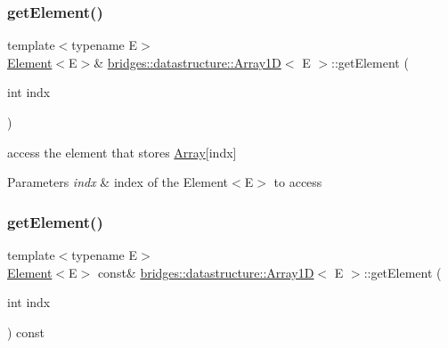 \subsubsection{\texorpdfstring{get\+Element()}{getElement()}\hspace{0.1cm}{\footnotesize\ttfamily [1/2]}}
{\footnotesize\ttfamily template$<$typename E$>$ \\
\hyperlink{classbridges_1_1datastructure_1_1_element}{Element}$<$E$>$\& \hyperlink{classbridges_1_1datastructure_1_1_array1_d}{bridges\+::datastructure\+::\+Array1D}$<$ E $>$\+::get\+Element (\begin{DoxyParamCaption}\item[{int}]{indx }\end{DoxyParamCaption})\hspace{0.3cm}{\ttfamily [inline]}}



access the element that stores \hyperlink{classbridges_1_1datastructure_1_1_array}{Array}\mbox{[}indx\mbox{]} 


\begin{DoxyParams}{Parameters}
{\em indx} & index of the Element$<$\+E$>$ to access \\
\hline
\end{DoxyParams}
\mbox{\label{classbridges_1_1datastructure_1_1_array1_d_a92398a260b9d2a09d6f1f536a36a0988}} 
\subsubsection{\texorpdfstring{get\+Element()}{getElement()}\hspace{0.1cm}{\footnotesize\ttfamily [2/2]}}
{\footnotesize\ttfamily template$<$typename E$>$ \\
\hyperlink{classbridges_1_1datastructure_1_1_element}{Element}$<$E$>$ const\& \hyperlink{classbridges_1_1datastructure_1_1_array1_d}{bridges\+::datastructure\+::\+Array1D}$<$ E $>$\+::get\+Element (\begin{DoxyParamCaption}\item[{int}]{indx }\end{DoxyParamCaption}) const\hspace{0.3cm}{\ttfamily [inline]}}



